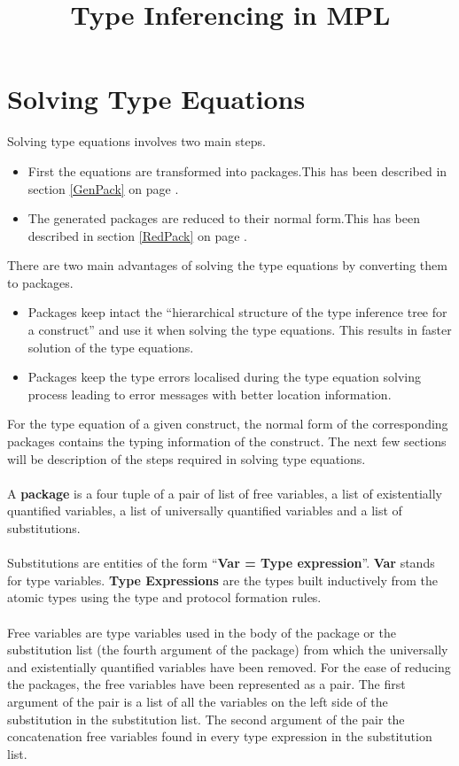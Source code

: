 \documentclass[11pt]{article}
\title{Type Inferencing in MPL}
\begin{document}
\maketitle
\section {Solving Type Equations}
Solving type equations involves two main steps.
\begin{itemize}
    \item First the equations are transformed into packages.This has been described in section \ref{GenPack} on page \pageref{GenPack}.
    \item The generated packages are reduced to their normal form.This has been described in section \ref{RedPack} on page \pageref{RedPack}. 
\end{itemize}
 There are two main advantages of solving the type equations by converting them to packages.
\begin{itemize} 
      \item Packages keep intact the ``hierarchical structure of the type inference tree for a construct'' and use it when solving the type equations. This results in faster solution of the type equations. 
      \item Packages keep the type errors localised during the type equation solving process leading to error messages with better location information.
  \end{itemize}  
For the type equation of a given construct, the normal form of the corresponding packages contains the typing information of the construct.
The next few sections will be description of the steps required in solving type equations.
~~\\~~\\
A {\bf package} is a four tuple of a pair of list of free variables, a list of existentially quantified variables, a list of universally quantified variables and a list of substitutions.
~~\\~~\\
 Substitutions are entities of the form ``{\bf Var = Type expression}''. {\bf Var} stands for type variables. {\bf Type Expressions} are the types built inductively from the atomic types using the type and protocol formation rules.
~~\\~~\\
Free variables are type variables used in the body of the package or the substitution list (the fourth argument of the package) from which the universally and existentially quantified variables have been removed. For the ease of reducing the packages, the free variables have been represented as a pair. The first argument of the pair is a list of all the variables on the left side of the substitution in the substitution list. The second argument of the pair the concatenation free variables found in every type expression in the substitution list.
\end{document}
